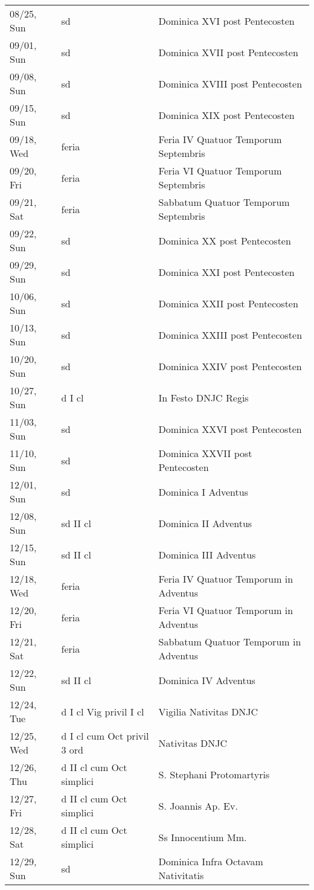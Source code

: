 \documentclass{article}
\begin{document}
\begin{longtable}{ l l l }
08/25, Sun & sd & Dominica XVI post Pentecosten\\
09/01, Sun & sd & Dominica XVII post Pentecosten\\
09/08, Sun & sd & Dominica XVIII post Pentecosten\\
09/15, Sun & sd & Dominica XIX post Pentecosten\\
09/18, Wed & feria & Feria IV Quatuor Temporum Septembris\\
09/20, Fri & feria & Feria VI Quatuor Temporum Septembris\\
09/21, Sat & feria & Sabbatum Quatuor Temporum Septembris\\
09/22, Sun & sd & Dominica XX post Pentecosten\\
09/29, Sun & sd & Dominica XXI post Pentecosten\\
10/06, Sun & sd & Dominica XXII post Pentecosten\\
10/13, Sun & sd & Dominica XXIII post Pentecosten\\
10/20, Sun & sd & Dominica XXIV post Pentecosten\\
10/27, Sun & d I cl & In Festo DNJC Regis\\
11/03, Sun & sd & Dominica XXVI post Pentecosten\\
11/10, Sun & sd & Dominica XXVII post Pentecosten\\
12/01, Sun & sd & Dominica I Adventus\\
12/08, Sun & sd II cl & Dominica II Adventus\\
12/15, Sun & sd II cl & Dominica III Adventus\\
12/18, Wed & feria & Feria IV Quatuor Temporum in Adventus\\
12/20, Fri & feria & Feria VI Quatuor Temporum in Adventus\\
12/21, Sat & feria & Sabbatum Quatuor Temporum in Adventus\\
12/22, Sun & sd II cl & Dominica IV Adventus\\
12/24, Tue & d I cl Vig privil I cl & Vigilia Nativitas DNJC\\
12/25, Wed & d I cl cum Oct privil 3 ord & Nativitas DNJC\\
12/26, Thu & d II cl cum Oct simplici & S. Stephani Protomartyris\\
12/27, Fri & d II cl cum Oct simplici & S. Joannis Ap. Ev.\\
12/28, Sat & d II cl cum Oct simplici & Ss Innocentium Mm.\\
12/29, Sun & sd & Dominica Infra Octavam Nativitatis\\

\end{longtable}
\end{document}
